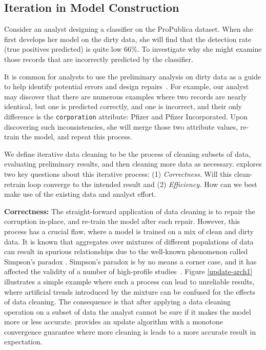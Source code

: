 \subsection{Iteration in Model Construction}\label{alcmp}
Consider an analyst designing a classifier on the ProPublica dataset.
When she first develops her model on the dirty data, she will find that the detection rate (true positives predicted) is quite low 66\%.
To investigate why she might examine those records that are incorrectly predicted by the classifier.

It is common for analysts to use the preliminary analysis on dirty data as a guide to help identify potential errors and design repairs~\cite{kandel2012}.
For example, our analyst may discover that there are numerous examples where two records are nearly identical, but one is predicted correctly, and one is incorrect, and their only difference is the \texttt{corporation} attribute: Pfizer and Pfizer Incorporated.
Upon discovering such inconsistencies, she will merge those two attribute values, re-train the model, and repeat this process.

We define iterative data cleaning to be the process of cleaning subsets of data, evaluating preliminary results, and then cleaning more data as necessary.
\sys explores two key questions about this iterative process: (1) \emph{Correctness.} Will this clean-retrain loop converge to the intended result and (2) \emph{Efficiency.} How can we best make use of the existing data and analyst effort.

\vspace{0.5em}
\noindent \textbf{Correctness: } The straight-forward application of data cleaning is to repair the corruption in-place, and re-train the model after each repair.
However, this process has a crucial flaw, where a model is trained on a mix of clean and dirty data.
It is known that aggregates over mixtures of different populations of data can result in spurious relationships due to the well-known phenomenon called Simpson's paradox \cite{simpson1951interpretation}.
Simpson's paradox is by no means a corner case, and it has affected the validity of a number of high-profile studies~\cite{pearl2003causality}.
Figure \ref{update-arch1} illustrates a simple example where such a process can lead to unreliable results, where artificial trends introduced by the mixture can be confused for the effects of data cleaning.
The consequence is that after applying a data cleaning operation on a subset of data the analyst cannot be sure if it makes the model more or less accurate.
\sys provides an update algorithm with a monotone convergence guarantee where more cleaning is leads to a more accurate result in expectation.

